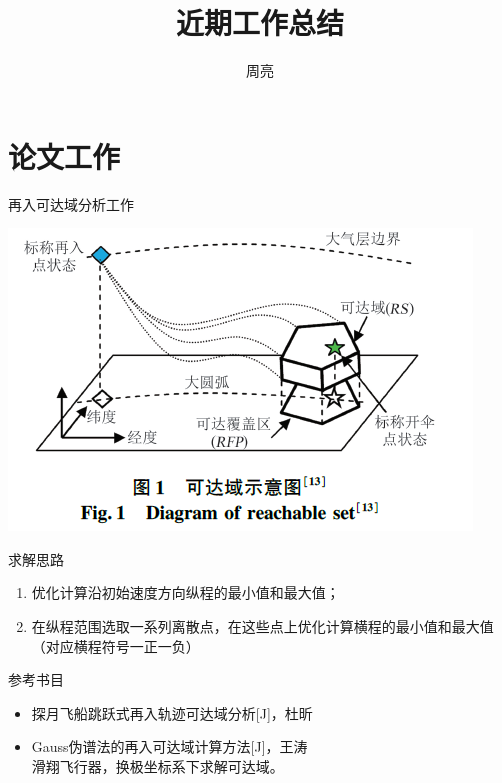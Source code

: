 \documentclass[11pt,UTF8]{ctexbeamer}
\author{周亮}
\title{近期工作总结}
\institute{102教研室}
\begin{document}
\begin{frame}
	\titlepage
\end{frame}

\begin{frame}
	\tableofcontents
\end{frame}

\section{论文工作}
\begin{frame}{再入可达域分析工作}
	\begin{minipage}{0.4\linewidth}
		\includegraphics[height=.4\textheight]{reachable_set.png}
	\end{minipage}
	\hspace{1cm}
	\begin{minipage}{0.4\linewidth}
		\begin{block}{求解思路}
			\begin{enumerate}
				\item 优化计算沿初始速度方向纵程的最小值和最大值；
				\item 在纵程范围选取一系列离散点，在这些点上优化计算横程的最小值和最大值（对应横程符号一正一负）
			\end{enumerate}
		\end{block}
	\end{minipage}
	\begin{block}{参考书目}
		\begin{itemize}
			\item {{\color{red} 探月飞船跳跃式再入轨迹可达域分析}[J]，杜昕}
			\item Gauss伪谱法的再入可达域计算方法[J]，王涛\\
			      滑翔飞行器，换极坐标系下求解可达域。
		\end{itemize}
	\end{block}
\end{frame}
\end{document}
